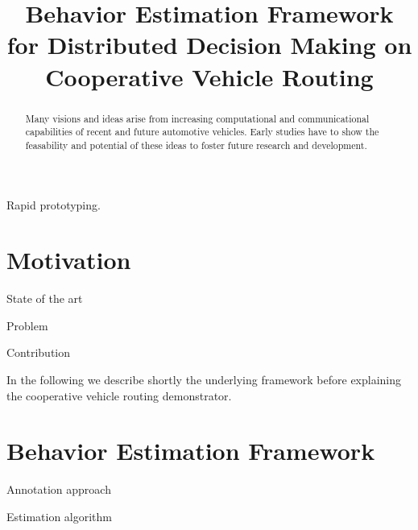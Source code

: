 \documentclass[conference]{../cls/IEEEtran}
\begin{document}
\title{Behavior Estimation Framework for Distributed Decision Making on Cooperative Vehicle Routing}

\author{
	\and
}

\maketitle

\begin{abstract}
Many visions and ideas arise from increasing computational and communicational capabilities of recent and future automotive vehicles.
Early studies have to show the feasability and potential of these ideas to foster future research and development.
\end{abstract}

\begin{IEEEkeywords}
Rapid prototyping.
\end{IEEEkeywords}

\section{Motivation}

State of the art

Problem

Contribution

In the following we describe shortly the underlying framework before explaining the cooperative vehicle routing demonstrator.

\section{Behavior Estimation Framework}

Annotation approach \cite{Hackenberg2012}

Estimation algorithm
\end{document}
